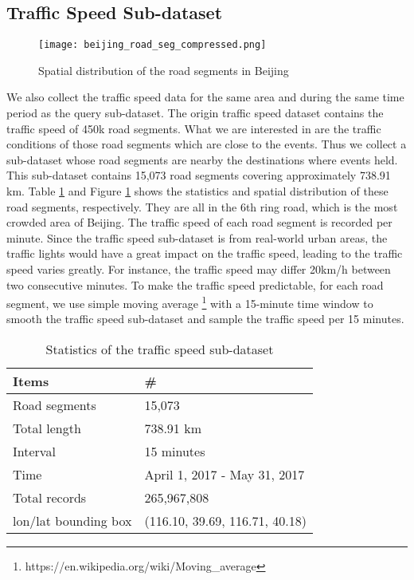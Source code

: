 \subsection{Traffic Speed Sub-dataset}

\begin{figure}[htbp]
\centering
\texttt{[image: beijing\_road\_seg\_compressed.png]}
\caption{Spatial distribution of the road segments in Beijing}
\label{fig:roadnetwork}
\end{figure}

We also collect the traffic speed data for the same area and during the same time period as the query sub-dataset. The origin traffic speed dataset contains the traffic speed of 450k road segments. What we are interested in are the traffic conditions of those road segments which are close to the events. Thus we collect a sub-dataset whose road segments are nearby the destinations where events held. This sub-dataset contains 15,073 road segments covering approximately 738.91 km. Table \ref{tab:trafficstats} and Figure  \ref{fig:roadnetwork} shows the statistics and spatial distribution of these road segments, respectively. They are all in the 6th ring road, which is the most crowded area of Beijing. The traffic speed of each road segment is recorded per minute. Since the traffic speed sub-dataset is from real-world urban areas, the traffic lights would have a great impact on the traffic speed, leading to the traffic speed varies greatly. For instance, the traffic speed may differ 20km/h between two consecutive minutes. To make the traffic speed predictable, for each road segment, we use simple moving average \footnote{https://en.wikipedia.org/wiki/Moving\_average} with a 15-minute time window to smooth the traffic speed sub-dataset and sample the traffic speed per 15 minutes. 

\begin{table}[htbp]
\centering
\caption{Statistics of the traffic speed sub-dataset}
\label{tab:trafficstats}
\begin{tabular}{ll}
\toprule
Items & \#  \\
\midrule
Road segments & 15,073 \\
Total length & 738.91 km \\
Interval & 15 minutes \\
Time & April 1, 2017 - May 31, 2017 \\
Total records & 265,967,808 \\
lon/lat bounding box &  (116.10, 39.69, 116.71, 40.18) \\
\bottomrule
\end{tabular}
\end{table}



